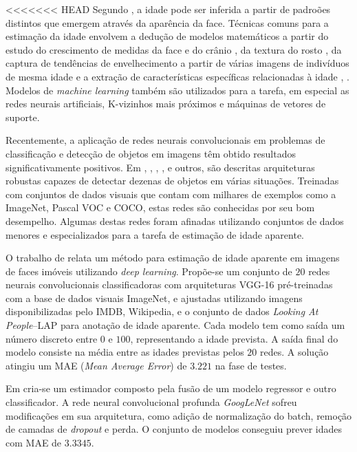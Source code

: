 <<<<<<< HEAD
Segundo \cite{fu2010age}, a idade pode ser inferida a partir de padroões distintos que emergem através da aparência da face. Técnicas comuns para a estimação da idade envolvem a dedução de modelos matemáticos a partir do estudo do crescimento de medidas da face e do crânio \cite{kwon1999age}, da textura do rosto \cite{lanitis2002toward}, da captura de tendências de envelhecimento a partir de várias imagens de indivíduos de mesma idade \cite{fu2007estimating} e a extração de características específicas relacionadas à idade \cite{suo2008design}, \cite{lou2018expression}. Modelos de \emph{machine learning} também são utilizados para a tarefa, em especial as redes neurais artificiais, K-vizinhos mais próximos e máquinas de vetores de suporte.

Recentemente, a aplicação de redes neurais convolucionais em problemas de classificação e detecção de objetos em imagens têm obtido resultados significativamente positivos. Em \cite{vggnet}, \cite{resnet}, \cite{inception}, \cite{redmon2016you}, \cite{ssd} e outros, são descritas arquiteturas robustas capazes de detectar dezenas de objetos em várias situações. Treinadas com conjuntos de dados visuais que contam com milhares de exemplos como a ImageNet, Pascal VOC e COCO, estas redes são conhecidas por seu bom desempelho. Algumas destas redes foram afinadas utilizando conjuntos de dados menores e especializados para a tarefa de estimação de idade aparente.

O trabalho de \cite{rothe2015dex} relata um método para estimação de idade aparente em imagens de faces imóveis utilizando \emph{deep learning}. Propõe-se um conjunto de $20$ redes neurais convolucionais classificadoras com arquiteturas VGG-16 pré-treinadas com a base de dados visuais ImageNet, e ajustadas utilizando imagens disponibilizadas pelo IMDB, Wikipedia, e o conjunto de dados \emph{Looking At People}--LAP para anotação de idade aparente. Cada modelo tem como saída um número discreto entre $0$ e $100$, representando a idade prevista. A saída final do modelo consiste na média entre as idades previstas pelos $20$ redes. A solução atingiu um MAE (\emph{Mean Average Error}) de $3.221$ na fase de testes.

Em \cite{liu2015agenet} cria-se um estimador composto pela fusão de um modelo regressor e outro classificador. A rede neural convolucional profunda \emph{GoogLeNet} \cite{inception} sofreu modificações em sua arquitetura, como adição de normalização do batch, remoção de camadas de \emph{dropout} e perda. O conjunto de modelos conseguiu prever idades com MAE de $3.3345$.

